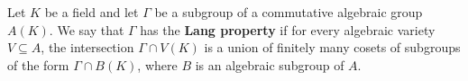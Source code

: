 Let $K$ be a field and let $\Gamma$ be a subgroup of a commutative algebraic group $A(K)$. We say that $\Gamma$ has the \textbf{Lang property} if for every algebraic variety $V \subseteq A$, the intersection $\Gamma \cap V(K)$ is a union of finitely many cosets of subgroups of the form $\Gamma \cap B(K)$, where $B$ is an algebraic subgroup of $A$.

